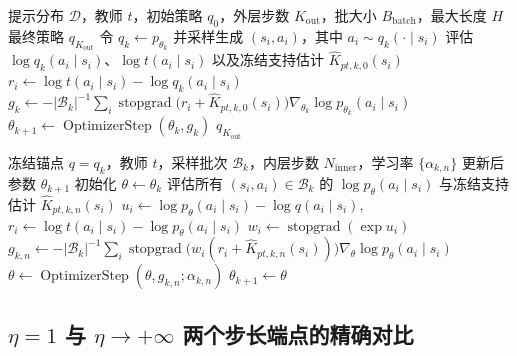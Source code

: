 \documentclass[lang=cn,scheme=chinese,openany]{elegantbook}
\newcommand{\sg}{\operatorname{stopgrad}}
\begin{document}
\begin{algorithm}[ht]
\caption{On-Policy OPD 基线\\{\small\textit{数学语义：每个外层步用当前学生重新采样 Rollout（$N_{\mathrm{inner}}=1$），无镜像近端正则}}}
\begin{algorithmic}[1]
\Require 提示分布 $\mathcal D$，教师 $t$，初始策略 $q_0$，外层步数 $K_{\mathrm{out}}$，批大小 $B_{\mathrm{batch}}$，最大长度 $H$
\Ensure 最终策略 $q_{K_{\mathrm{out}}}$
    \State 令 $q_k\gets p_{\theta_k}$ 并采样生成 $(s_i,a_i)$，其中 $a_i\sim q_k(\cdot\mid s_i)$
    \State 评估 $\log q_k(a_i\mid s_i)$、$\log t(a_i\mid s_i)$ 以及冻结支持估计 $\widehat K_{pt,k,0}(s_i)$
    \State $r_i\gets\log t(a_i\mid s_i)-\log q_k(a_i\mid s_i)$
    \State $g_k\gets-|\mathcal B_k|^{-1}\sum_i\sg\bigl(r_i+\widehat K_{pt,k,0}(s_i)\bigr)\nabla_{\theta_k}\log p_{\theta_k}(a_i\mid s_i)$
    \State $\theta_{k+1}\gets\operatorname{OptimizerStep}(\theta_k,g_k)$
\EndFor
\State \Return $q_{K_{\mathrm{out}}}$
\end{algorithmic}
\end{algorithm}

\begin{algorithm}[ht]
\caption{Token-IS OPD 基线\\{\small\textit{数学语义：复用锚点 Rollout 多步更新，仅通过 $p/q$ 修正固定前缀下的单步动作测度}}}
\begin{algorithmic}[1]
\Require 冻结锚点 $q=q_k$，教师 $t$，采样批次 $\mathcal B_k$，内层步数 $N_{\mathrm{inner}}$，学习率 $\{\alpha_{k,n}\}$
\Ensure 更新后参数 $\theta_{k+1}$
\State 初始化 $\theta\gets\theta_k$
    \State 评估所有 $(s_i,a_i)\in\mathcal B_k$ 的 $\log p_\theta(a_i\mid s_i)$ 与冻结支持估计 $\widehat K_{pt,k,n}(s_i)$
    \State $u_i\gets\log p_\theta(a_i\mid s_i)-\log q(a_i\mid s_i)$,\quad $r_i\gets\log t(a_i\mid s_i)-\log p_\theta(a_i\mid s_i)$
    \State $w_i\gets\sg(\exp u_i)$
    \State $g_{k,n}\gets-|\mathcal B_k|^{-1}\sum_i\sg\bigl(w_i(r_i+\widehat K_{pt,k,n}(s_i))\bigr)\nabla_\theta\log p_\theta(a_i\mid s_i)$
    \State $\theta\gets\operatorname{OptimizerStep}(\theta,g_{k,n};\alpha_{k,n})$
\EndFor
\State \Return $\theta_{k+1}\gets\theta$
\end{algorithmic}
\end{algorithm}

\subsection{\texorpdfstring{$\eta=1$}{eta=1} 与 \texorpdfstring{$\eta\to+\infty$}{eta -> +infinity} 两个步长端点的精确对比}
\label{subsec:ch2-opd-eta-one-vopd}
\label{subsec:ch2-opd-eta-infinity}
\end{document}
